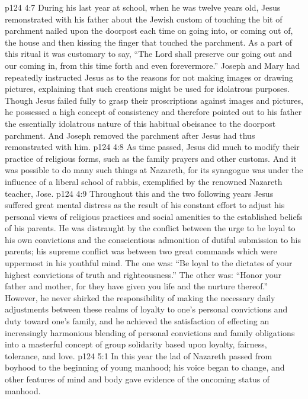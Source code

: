\pc \vs p124 4:7 During his last year at school, when he was twelve years old, Jesus remonstrated with his father about the Jewish custom of touching the bit of parchment nailed upon the doorpost each time on going into, or coming out of, the house and then kissing the finger that touched the parchment. As a part of this ritual it was customary to say, “The Lord shall preserve our going out and our coming in, from this time forth and even forevermore.” Joseph and Mary had repeatedly instructed Jesus as to the reasons for not making images or drawing pictures, explaining that such creations might be used for idolatrous purposes. Though Jesus failed fully to grasp their proscriptions against images and pictures, he possessed a high concept of consistency and therefore pointed out to his father the essentially idolatrous nature of this habitual obeisance to the doorpost parchment. And Joseph removed the parchment after Jesus had thus remonstrated with him.
\vs p124 4:8 As time passed, Jesus did much to modify their practice of religious forms, such as the family prayers and other customs. And it was possible to do many such things at Nazareth, for its synagogue was under the influence of a liberal school of rabbis, exemplified by the renowned Nazareth teacher, Jose.
\vs p124 4:9 Throughout this and the two following years Jesus suffered great mental distress as the result of his constant effort to adjust his personal views of religious practices and social amenities to the established beliefs of his parents. He was distraught by the conflict between the urge to be loyal to his own convictions and the conscientious admonition of dutiful submission to his parents; his supreme conflict was between two great commands which were uppermost in his youthful mind. The one was: “Be loyal to the dictates of your highest convictions of truth and righteousness.” The other was: “Honor your father and mother, for they have given you life and the nurture thereof.” However, he never shirked the responsibility of making the necessary daily adjustments between these realms of loyalty to one’s personal convictions and duty toward one’s family, and he achieved the satisfaction of effecting an increasingly harmonious blending of personal convictions and family obligations into a masterful concept of group solidarity based upon loyalty, fairness, tolerance, and love.
\vs p124 5:1 In this year the lad of Nazareth passed from boyhood to the beginning of young manhood; his voice began to change, and other features of mind and body gave evidence of the oncoming status of manhood.
